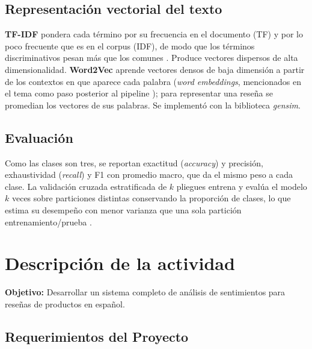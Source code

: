 \documentclass[11pt,letterpaper]{article}
\begin{document}
\subsection{Representación vectorial del texto}

\textbf{TF-IDF} pondera cada término por su frecuencia en el documento (TF) y por lo poco frecuente que es en el corpus (IDF), de modo que los términos discriminativos pesan más que los comunes \parencite{iae_u4_t41}. Produce vectores dispersos de alta dimensionalidad. \textbf{Word2Vec} aprende vectores densos de baja dimensión a partir de los contextos en que aparece cada palabra (\textit{word embeddings}, mencionados en el tema como paso posterior al pipeline \parencite{iae_u4_t41}); para representar una reseña se promedian los vectores de sus palabras. Se implementó con la biblioteca \textit{gensim}.

\subsection{Evaluación}

Como las clases son tres, se reportan exactitud (\textit{accuracy}) y precisión, exhaustividad (\textit{recall}) y F1 con promedio macro, que da el mismo peso a cada clase. La validación cruzada estratificada de $k$ pliegues entrena y evalúa el modelo $k$ veces sobre particiones distintas conservando la proporción de clases, lo que estima su desempeño con menor varianza que una sola partición entrenamiento/prueba \parencite{geron2022}.

\section{Descripción de la actividad}

\textbf{Objetivo:} Desarrollar un sistema completo de análisis de sentimientos para reseñas de productos en español.

\subsection*{Requerimientos del Proyecto}
\end{document}
